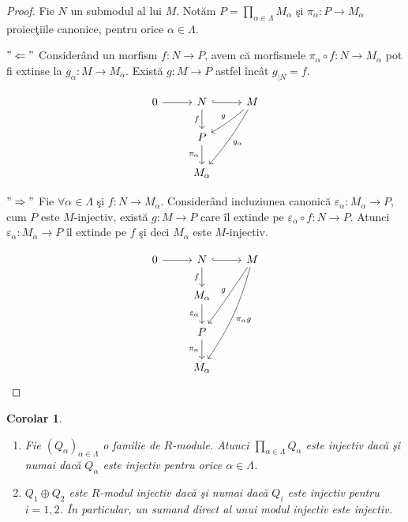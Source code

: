 \documentclass[12pt,a4paper]{book}
\theoremstyle{plain}
\newtheorem{corollary}[theorem]{Corolar}
\theoremstyle{definition}
\theoremstyle{remark}
\begin{document}
\begin{proof}
Fie \(N\) un submodul al lui \(M\).
Notăm \(P = \displaystyle\prod_{\alpha \in \Lambda} M_\alpha\) şi
\(\pi_\alpha : P \to M_\alpha\) proiecţiile canonice, pentru orice
\(\alpha \in \Lambda\).

\medskip
\noindent\("\Leftarrow"\) Considerând un morfism \(f : N \to P\), avem că
morfismele \(\pi_\alpha \circ f : N \to M_\alpha\) pot fi extinse la
\(g_\alpha : M \to M_\alpha\).
Există \(g : M \to P\) astfel încât \(g_{\mid N} = f\).

\[
\begin{tikzcd}
0 \arrow[r] &
N \arrow[r,hook] \arrow[d,"f"'] &
M \arrow[dl,bend left=5,"g"'] \arrow[ddl,bend left=5,"g_\alpha"] \\
& P \arrow[d,"\pi_\alpha"'] & \\
& M_\alpha &
\end{tikzcd}
\]

\noindent\("\Rightarrow"\) Fie \(\forall \alpha \in \Lambda\) şi \(f : N \to M_\alpha\).
Considerând incluziunea canonică
\(\varepsilon_\alpha : M_\alpha \to P\),
cum \(P\) este \(M\)-injectiv, există \(g : M \to P\) care îl extinde pe
\(\varepsilon_\alpha \circ f : N \to P\).
Atunci \(\varepsilon_\alpha : M_\alpha \to P\) îl extinde pe \(f\) şi deci
\(M_\alpha\) este \(M\)-injectiv.


\[
\begin{tikzcd}
0 \arrow[r] &
N \arrow[r, hook] \arrow[d,"f"'] &
M \arrow[ddl,bend left=1,"g"'] \arrow[dddl,bend left=9,"\pi_\alpha g"] \\
& M_\alpha \arrow[d,"\varepsilon_\alpha"'] & \\
& P \arrow[d,"\pi_\alpha"'] & \\
& M_\alpha &
\end{tikzcd}
\]

\end{proof}

\begin{corollary}
\leavevmode
\begin{enumerate}
  \item Fie \((Q_\alpha)_{\alpha \in \Lambda}\) o familie de \(R\)-module.
        Atunci \(\prod_{\alpha \in \Lambda} Q_\alpha\) este injectiv
        dacă şi numai dacă \(Q_\alpha\) este injectiv pentru orice \(\alpha\in\Lambda\).
  \item \(Q_1 \oplus Q_2\) este \(R\)-modul injectiv dacă şi numai dacă
        \(Q_i\) este injectiv pentru \(i=1,2\).
        În particular, un sumand direct al unui modul injectiv este injectiv.
\end{enumerate}
\end{corollary}
\end{document}
